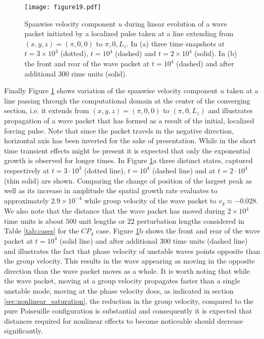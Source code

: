 \documentclass[lineno]{jfm}
\begin{document}
{\begin{figure}
\centering
\setlength{\tabcolsep}{-2pt}
    \texttt{[image: figure19.pdf]}
\caption{Spanwise velocity component $u$ during linear evolution of a wave packet initiated by a localized pulse taken at a line extending from $(x,y,z)=(\pi,0,0)$ to $\pi,0,L_z$. In (a) three time snapshots at $t=3\times10^3$ (dotted), $t=10^4$ (dashed) and $t=2\times10^4$ (solid). In (b) the front and rear of the wave packet at $t=10^4$ (dashed) and after additional $300$ rime units (solid). } 
\label{fig:linevol}
\end{figure}

Finally Figure \ref{fig:linevol} shows variation of the spanwise velocity component $u$ taken at a line passing through the computational domain at the center of the converging section, i.e. it extends from $(x,y,z)=(\pi,0,0)$ to $(\pi,0,L_z)$ and illustrates propagation of a wave packet that has formed as a result of the initial, localized forcing pulse.
Note that since the packet travels in the negative direction, horizontal axis has been inverted for the sake of presentation.
While in the short time transient effects might be present it is expected that only the exponential growth is observed for longer times.
In Figure \ref{fig:linevol}a three distinct states, captured respectively at $t=3\cdot10^3$ (dotted line), $t=10^4$ (dashed line) and at $t=2\cdot10^4$ (thin solid) are shown.
Comparing the change of position of the largest peak as well as its increase in amplitude the spatial growth rate evaluates to approximately $2.9\times10^{-4}$ while group velocity of the wave packet to $v_g\approx-0.028$.
We also note that the distance that the wave packet has moved during $2\times10^4$ time units is about $500$ unit lengths or $22$ perturbation lengths considered in Table \ref{tab:cases} for the $CP_4$ case.
Figure \ref{fig:linevol}b shows the front and rear of the wave packet at $t=10^4$ (solid line) and after additional $300$ time units (dashed line) and illustrates the fact that phase velocity of unstable waves points opposite than the group velocity.
This results in the wave appearing as moving in the opposite direction than the wave packet moves as a whole.
It is worth noting that while the wave packet, moving at a group velocity propagates faster than a single unstable mode, moving at the phase velocity does, as indicated in section \ref{sec:nonlinear_saturation}, the reduction in the group velocity, compared to the pure Poiseuille configuration is substantial and consequently it is expected that distances required for nonlinear effects to become noticeable should decrease significantly.  
}
\end{document}
